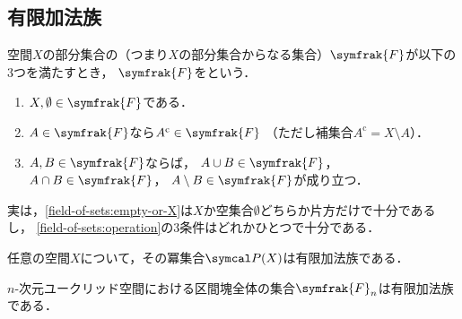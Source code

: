 \documentclass[../sotsu.tex]{subfiles}
\begin{document}
\subsection{有限加法族}

\begin{definition}
    \label{dfn:finitely-additive-class}
    空間$X$の部分集合の（つまり$X$の部分集合からなる集合）$\symfrak{F}$が以下の3つを満たすとき，
    $\symfrak{F}$をという．
    \begin{enumerate}
        \item \label{field-of-sets:empty-or-X}
            $X, \emptyset \in \symfrak{F}$である．
        \item \label{field-of-sets:complementation}
            $A \in \symfrak{F}$なら$A^{\mathrm{c}} \in \symfrak{F}$
            （ただし補集合$A^{\mathrm{c}} = X \setminus A$）．
        \item \label{field-of-sets:operation} 
            $A, B \in \symfrak{F}$ならば，
            $A \cup B \in \symfrak{F}$，
            $A \cap B \in \symfrak{F}$，
            $A \setminus B \in \symfrak{F}$が成り立つ．
    \end{enumerate}
\end{definition}

実は，\cref{field-of-sets:empty-or-X}は$X$か空集合$\emptyset$どちらか片方だけで十分であるし，
\cref{field-of-sets:operation}の3条件はどれかひとつで十分である．

\begin{example}
    任意の空間$X$について，その冪集合$\pset(X)$は有限加法族である．
\end{example}

\begin{example}
    $n$-次元ユークリッド空間における区間塊全体の集合$\symfrak{F}_n$は有限加法族である\cite[\S 4]{ito-lebesgue-1963}．
\end{example}
\end{document}
